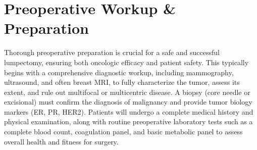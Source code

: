 \section*{Preoperative Workup \& Preparation}
Thorough preoperative preparation is crucial for a safe and successful lumpectomy, ensuring both oncologic efficacy and patient safety. This typically begins with a comprehensive diagnostic workup, including mammography, ultrasound, and often breast MRI, to fully characterize the tumor, assess its extent, and rule out multifocal or multicentric disease. A biopsy (core needle or excisional) must confirm the diagnosis of malignancy and provide tumor biology markers (ER, PR, HER2). Patients will undergo a complete medical history and physical examination, along with routine preoperative laboratory tests such as a complete blood count, coagulation panel, and basic metabolic panel to assess overall health and fitness for surgery.

